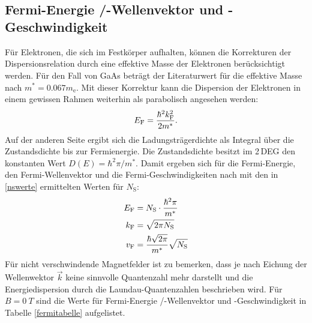 \documentclass[paper=a4,fontsize=10pt,DIV=18,twocolumn,parskip=half]{scrartcl}
\numberwithin{equation}{section}    %
\begin{document}

%
%
~~~~~~~~~~~~~~~~~~~~~~~~~~~~~~~~~~~~~~~~~~~~~~~~~~~~~~~~~~~~~~~~~~~~~~~~~~~~~
\subsection{Fermi-Energie /-Wellenvektor und -Geschwindigkeit}
\label{a5}
Für Elektronen, die sich im Festkörper aufhalten, können die Korrekturen der Dispersionsrelation durch eine effektive Masse der Elektronen berücksichtigt werden. Für den Fall von GaAs beträgt der Literaturwert für die effektive Masse nach \citet{saarland} $m^*=0.067 m_\mathrm{e}$. Mit dieser Korrektur kann die Dispersion der Elektronen in einem gewissen Rahmen weiterhin als parabolisch angesehen werden:
\begin{equation}
E_{\rm F}=\frac{\hbar^2 k_{\rm F}^2}{2 m^*}.
\end{equation}
Auf der anderen Seite ergibt sich die Ladungsträgerdichte als Integral über die Zustandsdichte bis zur Fermienergie. Die Zustandsdichte besitzt im 2\,DEG den konstanten Wert $D(E)=\hbar^2 \pi/m^*$.
Damit ergeben sich für die Fermi-Energie, den Fermi-Wellenvektor und die Fermi-Geschwindigkeiten nach \citet{Anleitung} mit den in \ref{nswerte} ermittelten Werten für $N_\mathrm{S}$:
\begin{align}
E_{\rm F}&=N_\mathrm{S} \cdot \frac{\hbar^2 \pi}{m^*}\\
k_{\rm F}&=\sqrt{2 \pi N_\mathrm{S}}\\
v_{\rm F}&=\frac{\hbar\sqrt{2 \pi}}{m^*} \sqrt{N_\mathrm{S}}
\end{align}
Für nicht verschwindende Magnetfelder ist zu bemerken, dass je nach Eichung der Wellenwektor $\vec{k}$ keine sinnvolle Quantenzahl mehr darstellt und die Energiedispersion durch die Laundau-Quantenzahlen beschrieben wird.
Für $B=\SI{0}{T}$ sind die Werte für Fermi-Energie /-Wellenvektor und -Geschwindigkeit in Tabelle \ref{fermitabelle} aufgelistet.
\end{document}
